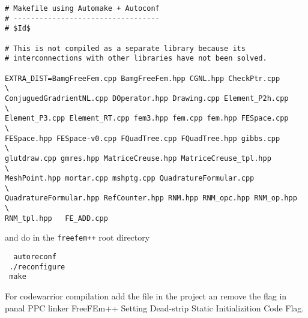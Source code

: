 \begin{verbatim}
# Makefile using Automake + Autoconf
# ----------------------------------
# $Id$

# This is not compiled as a separate library because its
# interconnections with other libraries have not been solved.

EXTRA_DIST=BamgFreeFem.cpp BamgFreeFem.hpp CGNL.hpp CheckPtr.cpp        \
ConjuguedGradrientNL.cpp DOperator.hpp Drawing.cpp Element_P2h.cpp      \
Element_P3.cpp Element_RT.cpp fem3.hpp fem.cpp fem.hpp FESpace.cpp      \
FESpace.hpp FESpace-v0.cpp FQuadTree.cpp FQuadTree.hpp gibbs.cpp        \
glutdraw.cpp gmres.hpp MatriceCreuse.hpp MatriceCreuse_tpl.hpp          \
MeshPoint.hpp mortar.cpp mshptg.cpp QuadratureFormular.cpp              \
QuadratureFormular.hpp RefCounter.hpp RNM.hpp RNM_opc.hpp RNM_op.hpp    \
RNM_tpl.hpp   FE_ADD.cpp

\end{verbatim}

and do in the \texttt{freefem++} root directory
\begin{verbatim}
  autoreconf
 ./reconfigure
 make
\end{verbatim}
 



For codewarrior compilation add the file in the project an remove the flag
in panal  PPC linker FreeFEm++ Setting Dead-strip Static Initializition Code Flag.
